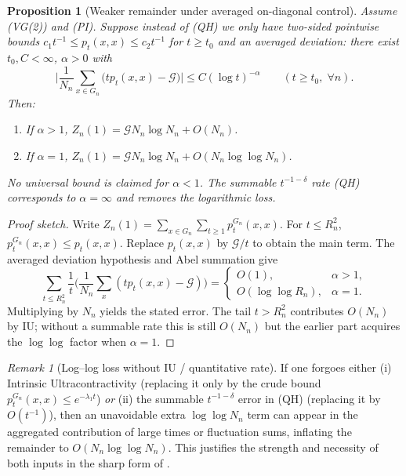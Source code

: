 \documentclass{article}
\numberwithin{equation}{section}
\newtheorem{proposition}[theorem]{Proposition}
\theoremstyle{definition}
\theoremstyle{remark}
\newtheorem{remark}[theorem]{Remark}
\newcommand{\cG}{\mathcal{G}}
\begin{document}
\begin{proposition}[Weaker remainder under averaged on-diagonal control]\label{prop:weaker_remainder}
Assume (VG(2)) and (PI). Suppose instead of (QH) we only have two-sided pointwise bounds $c_1 t^{-1}\le p_t(x,x)\le c_2 t^{-1}$ for $t\ge t_0$ and an averaged deviation: there exist $t_0,C<\infty$, $\alpha>0$ with
\[
  \Big| \frac{1}{N_n} \sum_{x\in G_n} \Big( t p_t(x,x) - \cG \Big) \Big| \le C (\log t)^{-\alpha}\qquad(t\ge t_0,\;\forall n).
\]
Then:
\begin{enumerate}
  \item If $\alpha>1$, $Z_n(1)=\cG N_n \log N_n + O(N_n)$.
  \item If $\alpha=1$, $Z_n(1)=\cG N_n \log N_n + O(N_n \log\log N_n)$.
\end{enumerate}
\emph{No universal bound is claimed for $\alpha<1$.} The summable $t^{-1-\delta}$ rate (QH) corresponds to $\alpha=\infty$ and removes the logarithmic loss.
\end{proposition}
\begin{proof}[Proof sketch]
Write $Z_n(1)=\sum_{x\in G_n}\sum_{t\ge1} p_t^{G_n}(x,x)$. For $t\le R_n^2$, $p_t^{G_n}(x,x)\le p_t(x,x)$. Replace $p_t(x,x)$ by $\cG/t$ to obtain the main term. The averaged deviation hypothesis and Abel summation give
\[
\sum_{t\le R_n^2} \frac{1}{t} \Big( \frac{1}{N_n}\sum_{x} (t p_t(x,x)-\cG) \Big)=
\begin{cases}O(1), & \alpha>1,\\ O(\log\log R_n), & \alpha=1.\end{cases}
\]
Multiplying by $N_n$ yields the stated error. The tail $t>R_n^2$ contributes $O(N_n)$ by IU; without a summable rate this is still $O(N_n)$ but the earlier part acquires the $\log\log$ factor when $\alpha=1$.\end{proof}

\begin{remark}[Log--log loss without IU / quantitative rate]\label{rem:loglog}
If one forgoes either (i) Intrinsic Ultracontractivity (replacing it only by the crude bound $p_t^{G_n}(x,x)\le e^{-\lambda_1 t}$) \emph{or} (ii) the summable $t^{-1-\delta}$ error in (QH) (replacing it by $O(t^{-1})$), then an unavoidable extra $\log\log N_n$ term can appear in the aggregated contribution of large times or fluctuation sums, inflating the remainder to $O(N_n \log\log N_n)$. This justifies the strength and necessity of both inputs in the sharp form of .
\end{remark}
\end{document}

